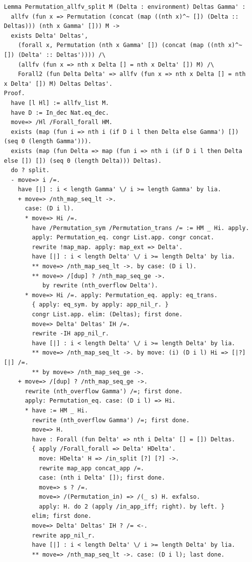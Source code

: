 \documentclass[10pt,a4paper]{article}
\begin{document}
\begin{lstlisting}[style=authorcoq]
Lemma Permutation_allfv_split M (Delta : environment) Deltas Gamma' :
  allfv (fun x => Permutation (concat (map ((nth x)^~ []) (Delta :: Deltas))) (nth x Gamma' [])) M ->
  exists Delta' Deltas',
    (forall x, Permutation (nth x Gamma' []) (concat (map ((nth x)^~ []) (Delta' :: Deltas')))) /\
    (allfv (fun x => nth x Delta [] = nth x Delta' []) M) /\
    Forall2 (fun Delta Delta' => allfv (fun x => nth x Delta [] = nth x Delta' []) M) Deltas Deltas'.
Proof.
  have [l Hl] := allfv_list M.
  have D := In_dec Nat.eq_dec.
  move=> /Hl /Forall_forall HM.
  exists (map (fun i => nth i (if D i l then Delta else Gamma') []) (seq 0 (length Gamma'))).
  exists (map (fun Delta => map (fun i => nth i (if D i l then Delta else []) []) (seq 0 (length Delta))) Deltas).
  do ? split.
  - move=> i /=.
    have [|] : i < length Gamma' \/ i >= length Gamma' by lia.
    + move=> /nth_map_seq_lt ->.
      case: (D i l).
      * move=> Hi /=.
        have /Permutation_sym /Permutation_trans /= := HM _ Hi. apply.
        apply: Permutation_eq. congr List.app. congr concat.
        rewrite !map_map. apply: map_ext => Delta'.
        have [|] : i < length Delta' \/ i >= length Delta' by lia.
        ** move=> /nth_map_seq_lt ->. by case: (D i l).
        ** move=> /[dup] ? /nth_map_seq_ge ->.
           by rewrite (nth_overflow Delta').
      * move=> Hi /=. apply: Permutation_eq. apply: eq_trans.
        { apply: eq_sym. by apply: app_nil_r. }
        congr List.app. elim: (Deltas); first done.
        move=> Delta' Deltas' IH /=.
        rewrite -IH app_nil_r.
        have [|] : i < length Delta' \/ i >= length Delta' by lia.
        ** move=> /nth_map_seq_lt ->. by move: (i) (D i l) Hi => [|?] [|] /=.
        ** by move=> /nth_map_seq_ge ->.
    + move=> /[dup] ? /nth_map_seq_ge ->.
      rewrite (nth_overflow Gamma') /=; first done.
      apply: Permutation_eq. case: (D i l) => Hi.
      * have := HM _ Hi.
        rewrite (nth_overflow Gamma') /=; first done.
        move=> H.
        have : Forall (fun Delta' => nth i Delta' [] = []) Deltas.
        { apply /Forall_forall => Delta' HDelta'.
          move: HDelta' H => /in_split [?] [?] ->.
          rewrite map_app concat_app /=.
          case: (nth i Delta' []); first done.
          move=> s ? /=.
          move=> /(Permutation_in) => /(_ s) H. exfalso.
          apply: H. do 2 (apply /in_app_iff; right). by left. }
        elim; first done.
        move=> Delta' Deltas' IH ? /= <-.
        rewrite app_nil_r.
        have [|] : i < length Delta' \/ i >= length Delta' by lia.
        ** move=> /nth_map_seq_lt ->. case: (D i l); last done.

\end{lstlisting}
\end{document}
